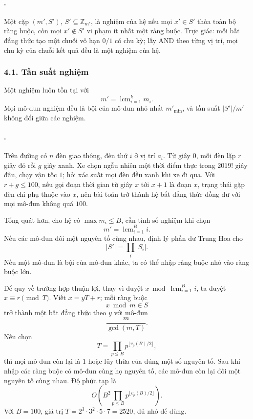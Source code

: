 \documentclass[11pt]{article}
\begin{document}
\paragraph{.}
Một cặp \((m',S')\), \(S'\subseteq\mathbb Z_{m'}\), là nghiệm của hệ nếu mọi
\(x'\in S'\) thỏa toàn bộ ràng buộc, còn mọi \(x'\notin S'\) vi phạm ít nhất
một ràng buộc. Trực giác: mỗi bất đẳng thức tạo một chuỗi vô hạn \(0/1\) có
chu kỳ; lấy AND theo từng vị trí, mọi chu kỳ của chuỗi kết quả đều là một
nghiệm của hệ.

\subsubsection*{4.1. Tần suất nghiệm}

Một nghiệm luôn tồn tại với
\[
  m'=\operatorname{lcm}_{i=1}^{k}m_i.
\]
Mọi mô-đun nghiệm đều là bội của mô-đun nhỏ nhất \(m'_{\min}\), và tần suất
\(|S'|/m'\) không đổi giữa các nghiệm.

\paragraph{.}
Trên đường có \(n\) đèn giao thông, đèn thứ \(i\) ở vị trí \(a_i\). Từ giây
\(0\), mỗi đèn lặp \(r\) giây đỏ rồi \(g\) giây xanh. Xe chọn ngẫu nhiên một
thời điểm thực trong \(2019!\) giây đầu, chạy vận tốc \(1\); hỏi xác suất mọi
đèn đều xanh khi xe đi qua. Với \(r+g\le 100\), nếu gọi đoạn thời gian từ
giây \(x\) tới \(x+1\) là đoạn \(x\), trạng thái gặp đèn chỉ phụ thuộc vào
\(x\), nên bài toán trở thành hệ bất đẳng thức đồng dư với mọi mô-đun không
quá \(100\).

Tổng quát hơn, cho hệ có \(\max m_i\le B\), cần tính số nghiệm khi chọn
\[
  m'=\operatorname{lcm}_{i=1}^{B}i.
\]
Nếu các mô-đun đôi một nguyên tố cùng nhau, định lý phần dư Trung Hoa cho
\[
  |S'|=\prod_i |S_i|.
\]
Nếu một mô-đun là bội của mô-đun khác, ta có thể nhập ràng buộc nhỏ vào ràng
buộc lớn.

Để quy về trường hợp thuận lợi, thay vì duyệt \(x\bmod \operatorname{lcm}_{i=1}^B i\),
ta duyệt \(x\equiv r\pmod T\). Viết \(x=yT+r\); mỗi ràng buộc
\[
  x\bmod m\in S
\]
trở thành một bất đẳng thức theo \(y\) với mô-đun
\[
  \frac{m}{\gcd(m,T)}.
\]
Nếu chọn
\[
  T=\prod_{p\le B}p^{\lfloor v_p(B)/2\rfloor},
\]
thì mọi mô-đun còn lại là \(1\) hoặc lũy thừa của đúng một số nguyên tố. Sau
khi nhập các ràng buộc có mô-đun cùng họ nguyên tố, các mô-đun còn lại đôi một
nguyên tố cùng nhau. Độ phức tạp là
\[
  O\left(B^2\prod_{p\le B}p^{\lfloor v_p(B)/2\rfloor}\right).
\]
Với \(B=100\), giá trị \(T=2^3\cdot 3^2\cdot 5\cdot 7=2520\), đủ nhỏ để dùng.
\end{document}
